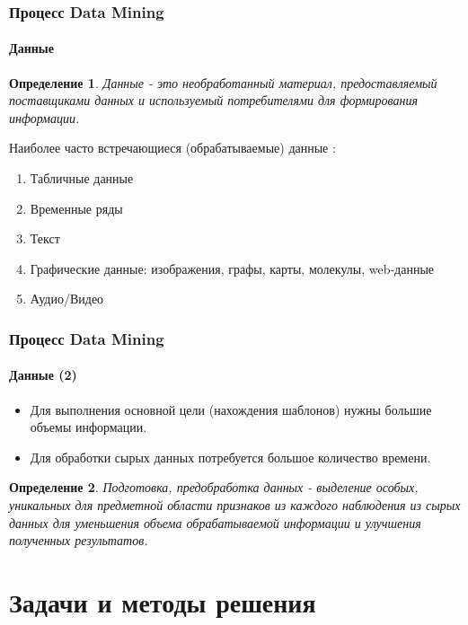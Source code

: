 \documentclass[xcolor=table]{beamer}
\newtheorem{defn}{Определение}
\begin{document}
\begin{frame}
  \frametitle{Процесс Data Mining}
  \framesubtitle{Данные}
  
  \begin{defn}
    Данные - это необработанный материал, предоставляемый поставщиками \emph{данных} и используемый потребителями для формирования информации.
  \end{defn}

  Наиболее часто встречающиеся (обрабатываемые) данные \footnotemark:
  \begin{enumerate}
    \item Табличные данные
    \item Временные ряды
    \item Текст
    \item Графические данные: изображения, графы, карты, молекулы, web-данные
    \item Аудио/Видео
  \end{enumerate}

\end{frame}

\begin{frame}
  \frametitle{Процесс Data Mining}
  \framesubtitle{Данные (2)}
  
  \begin{itemize}
  \item Для выполнения основной цели (нахождения шаблонов) нужны большие объемы информации.
    
  \item Для обработки сырых данных потребуется большое количество времени.
  \end{itemize}
  
  \begin{defn}
    Подготовка, предобработка данных - выделение особых, уникальных для предметной области признаков из каждого наблюдения из сырых данных для уменьшения объема обрабатываемой информации и улучшения полученных результатов.
  \end{defn}

\end{frame}


\section{Задачи и методы решения}
\end{document}
